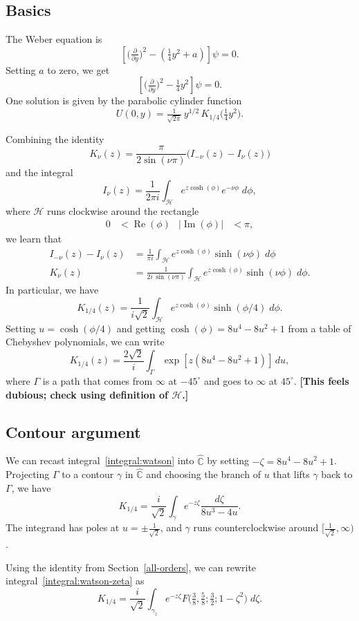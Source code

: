 \documentclass{article}
\newcommand{\C}{\mathbb{C}}
\begin{document}
\subsection{Basics}
The Weber equation is
\[ \left[\big(\tfrac{\partial}{\partial y}\big)^2 - \left(\tfrac{1}{4}y^2 + a\right)\right] \psi = 0. \]
Setting $a$ to zero, we get
\begin{equation}\label{eqn:weber}
\left[\big(\tfrac{\partial}{\partial y}\big)^2 - \tfrac{1}{4}y^2\right] \psi = 0.
\end{equation}
One solution is given by the parabolic cylinder function~\cite[equation~12.7.10]{dlmf}
\[ U(0, y) = \tfrac{1}{\sqrt{2\pi}}\,y^{1/2}\,K_{1/4}\big(\tfrac{1}{4} y^2\big). \]

Combining the identity \cite[equation~10.27.4]{dlmf}
\[ K_\nu(z) = \frac{\pi}{2 \sin(\nu \pi)}\big(I_{-\nu}(z) - I_\nu(z)\big) \]
and the integral \cite[equation~10.32.12]{dlmf}
\[ I_\nu(z) = \frac{1}{2\pi i} \int_{\mathcal{H}} e^{z \cosh(\phi)} e^{-\nu \phi}\;d\phi, \]
where $\mathcal{H}$ runs clockwise around the rectangle
\begin{align*}
0 & < \operatorname{Re}(\phi) & |\operatorname{Im}(\phi)| & < \pi,
\end{align*}
we learn that
\begin{align*}
I_{-\nu}(z) - I_\nu(z) & = \frac{1}{\pi i} \int_{\mathcal{H}} e^{z \cosh(\phi)} \sinh(\nu \phi)\;d\phi \\
K_\nu(z) & = \frac{1}{2i\,\sin(\nu \pi)} \int_{\mathcal{H}} e^{z \cosh(\phi)} \sinh(\nu \phi)\;d\phi.
\end{align*}
In particular, we have
\[ K_{1/4}(z) = \frac{1}{i\sqrt{2}} \int_{\mathcal{H}} e^{z \cosh(\phi)} \sinh(\phi/4)\;d\phi. \]
Setting $u = \cosh(\phi/4)$ and getting $\cosh(\phi) = 8u^4 - 8u^2 + 1$ from a table of Chebyshev polynomials, we can write
\begin{equation}\label{integral:watson}
K_{1/4}(z) = \frac{2\sqrt{2}}{i} \int_\Gamma \exp\left[z \left(8u^4 - 8u^2 + 1\right)\right]\,du,
\end{equation}
where $\Gamma$ is a path that comes from $\infty$ at $-45^\circ$ and goes to $\infty$ at $45^\circ$. \textbf{[This feels dubious; check using definition of $\mathcal{H}$.]}
\subsection{Contour argument}\label{contour-argument}
We can recast integral~\ref{integral:watson} into $\hat{\C}$ by setting $-\zeta = 8u^4 - 8u^2 + 1$. Projecting $\Gamma$ to a contour $\gamma$ in $\hat{\C}$ and choosing the branch of $u$ that lifts $\gamma$ back to $\Gamma$, we have
\begin{equation}\label{integral:watson-zeta}
K_{1/4} = \frac{i}{\sqrt{2}} \int_\gamma e^{-z\zeta}\frac{d\zeta}{8u^3 - 4u}.
\end{equation}
The integrand has poles at $u = \pm\tfrac{1}{\sqrt{2}}$, and $\gamma$ runs counterclockwise around $\big[\tfrac{1}{\sqrt{2}}, \infty\big)$.

Using the identity from Section~\ref{all-orders}, we can rewrite integral~\ref{integral:watson-zeta} as
\[ K_{1/4} = \frac{i}{\sqrt{2}} \int_{\gamma_z} e^{-z\zeta} F\big(\tfrac{3}{8}, \tfrac{5}{8}; \tfrac{3}{2}; 1 - \zeta^2\big)\;d\zeta. \]


\end{document}
